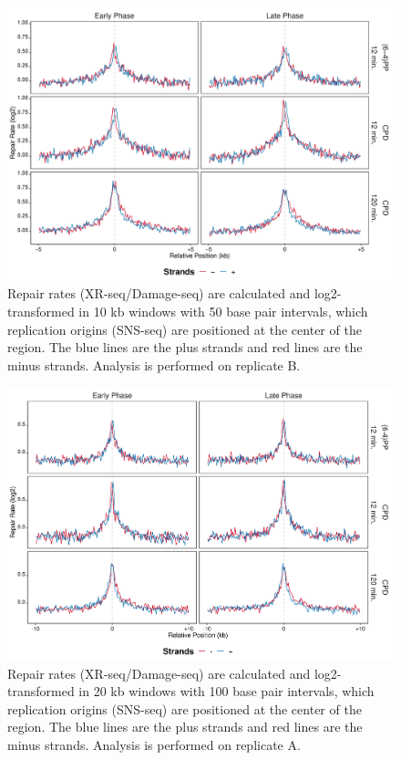 \begin{figure}[H]
\begin{center}
\includegraphics[width=\textwidth]{Chapters/7_appendix/figures/supfig51}
\caption[Repair rate of replication origins in 10 kb (replicate B).]{Repair rates (XR-seq/Damage-seq) are calculated and log2-transformed in 10 kb windows with 50 base pair intervals, which replication origins (SNS-seq) are positioned at the center of the region. The blue lines are the plus strands and red lines are the minus strands. Analysis is performed on replicate B.}
\label{supfig:rr10snsB}
\end{center}
\end{figure}

\begin{figure}[H]
\begin{center}
\includegraphics[width=\textwidth]{Chapters/7_appendix/figures/supfig52}
\caption[Repair rate of replication origins in 20 kb (replicate A).]{Repair rates (XR-seq/Damage-seq) are calculated and log2-transformed in 20 kb windows with 100 base pair intervals, which replication origins (SNS-seq) are positioned at the center of the region. The blue lines are the plus strands and red lines are the minus strands. Analysis is performed on replicate A.}
\label{supfig:rr20snsA}
\end{center}
\end{figure}

